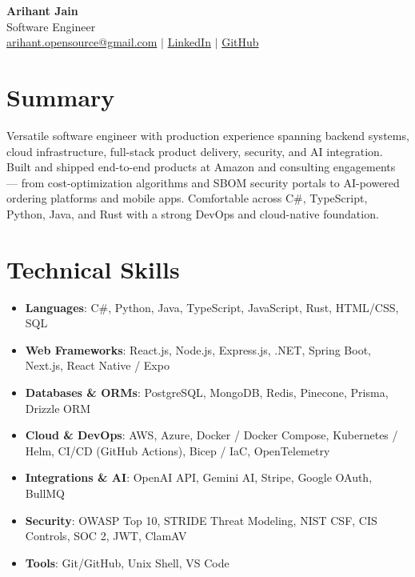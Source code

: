 \documentclass[11pt,a4paper]{article}
\begin{document}
\begin{center}
{\LARGE \textbf{Arihant Jain}}
\\ Software Engineer
\\ \href{mailto:arihant.opensource@gmail.com}{arihant.opensource@gmail.com} $\mid$ \href{https://linkedin.com/in/arihantjain1208}{LinkedIn} $\mid$ \href{https://github.com/Arihant1208}{GitHub}
\end{center}

\section{Summary}
Versatile software engineer with production experience spanning backend systems, cloud infrastructure, full-stack product delivery, security, and AI integration. Built and shipped end-to-end products at Amazon and consulting engagements --- from cost-optimization algorithms and SBOM security portals to AI-powered ordering platforms and mobile apps. Comfortable across C\#, TypeScript, Python, Java, and Rust with a strong DevOps and cloud-native foundation.

\section{Technical Skills}
\begin{itemize}
  \item \textbf{Languages}: C\#, Python, Java, TypeScript, JavaScript, Rust, HTML/CSS, SQL
  \item \textbf{Web Frameworks}: React.js, Node.js, Express.js, .NET, Spring Boot, Next.js, React Native / Expo
  \item \textbf{Databases \& ORMs}: PostgreSQL, MongoDB, Redis, Pinecone, Prisma, Drizzle ORM
  \item \textbf{Cloud \& DevOps}: AWS, Azure, Docker / Docker Compose, Kubernetes / Helm, CI/CD (GitHub Actions), Bicep / IaC, OpenTelemetry
  \item \textbf{Integrations \& AI}: OpenAI API, Gemini AI, Stripe, Google OAuth, BullMQ
  \item \textbf{Security}: OWASP Top 10, STRIDE Threat Modeling, NIST CSF, CIS Controls, SOC 2, JWT, ClamAV
  \item \textbf{Tools}: Git/GitHub, Unix Shell, VS Code
\end{itemize}
\end{document}
